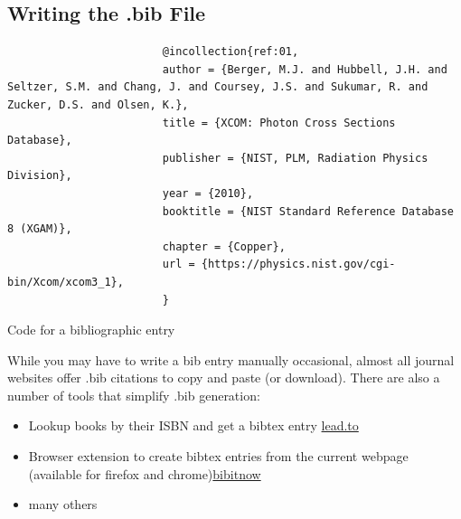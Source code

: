 \documentclass[hidelinks, 12pt]{article}%
\begin{document}
        \subsection{Writing the .bib File}
            \begin{listing}[H]
                \begin{centering}
                    \begin{verbatim}
                        @incollection{ref:01,
                        author = {Berger, M.J. and Hubbell, J.H. and Seltzer, S.M. and Chang, J. and Coursey, J.S. and Sukumar, R. and Zucker, D.S. and Olsen, K.},
                        title = {XCOM: Photon Cross Sections Database},
                        publisher = {NIST, PLM, Radiation Physics Division},
                        year = {2010},
                        booktitle = {NIST Standard Reference Database 8 (XGAM)},
                        chapter = {Copper},
                        url = {https://physics.nist.gov/cgi-bin/Xcom/xcom3_1},
                        }
                    \end{verbatim}
                    \caption{Code for a bibliographic entry}
                    \label{lst:bibliography}
                \end{centering}
            \end{listing}
            While you may have to write a bib entry manually occasional, almost all journal websites offer .bib citations to copy and paste (or download).
            There are also a number of tools that simplify .bib generation:
            \begin{itemize}
                \item Lookup books by their ISBN and get a bibtex entry \href{https://lead.to/amazon/com/?key=+&si=all&op=bt&bn=&so=sa&ht=us}{lead.to}
                \item Browser extension to create bibtex entries from the current webpage (available for firefox and chrome)\href{https://github.com/Langenscheiss/bibitnow}{bibitnow}
                \item many others
            \end{itemize}
\end{document}
